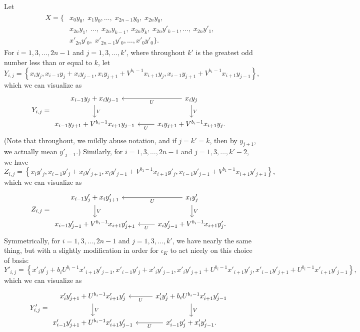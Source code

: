 \documentclass[11pt, reqno]{amsart}
\theoremstyle{definition}
\theoremstyle{remark}
\numberwithin{equation}{section}
\begin{document}
Let
\begin{gather}
\begin{aligned}\label{eqn:X}
	X = \{&x_0y_0, \; x_1y_0, \dots, \; x_{2n-1}y_0, \; x_{2n}y_0, \\
		& x_{2n}y_1, \; \dots, \; x_{2n}y_{k-1}, \; x_{2n}y_k, \; x_{2n}y'_{k-1}, \dots, \; x_{2n}y'_1, \\
		& x'_{2n}y'_0, \; x'_{2n-1}y'_0,  \dots, x'_0y'_0\}.
\end{aligned}
\end{gather}
For $i=1, 3, \dots, 2n-1$ and $j=1, 3, \dots, k'$, where throughout $k'$ is the greatest odd number less than or equal to $k$, let
\[ Y_{i, j} = \left\{ x_i y_j, x_{i-1}y_{j}+x_i y_{j-1}, x_{i} y_{j+1} + V^{b_1-1}x_{i+1}y_{j}, x_{i-1}y_{j+1}+V^{b_1-1}x_{i+1} y_{j-1}  \right\}, \]
which we can visualize as
\[
Y_{i,j} = \begin{tikzcd}
	 x_{i-1}y_{j}+x_i y_{j-1} \ar[d, "V"] & x_i y_j \ar[l, "U"] \ar[d, "V"]  \\
	 x_{i-1}y_{j+1}+V^{b_i-1}x_{i+1} y_{j-1} & x_i y_{j+1} + V^{b_i-1}x_{i+1}y_{j}. \ar[l, "U"] 
\end{tikzcd}
\]
(Note that throughout, we mildly abuse notation, and if $j=k'=k$, then by $y_{j+1}$, we actually mean $y'_{j-1}$.)
Similarly, for $i=1, 3, \dots, 2n-1$ and $j=1, 3, \dots, k'-2$, we have
\[ Z_{i, j} = \left\{ x_i y'_j, x_{i-1}y'_{j}+x_i y'_{j+1}, x_{i} y'_{j-1} + V^{b_1-1}x_{i+1}y'_{j}, x_{i-1}y'_{j-1}+V^{b_1-1}x_{i+1} y'_{j+1}  \right\}, \]
which we can visualize as
\[
Z_{i,j} = \begin{tikzcd}
	 x_{i-1}y'_{j}+x_i y'_{j+1} \ar[d, "V"] & x_i y'_j \ar[l, "U"] \ar[d, "V"]  \\
	 x_{i-1}y'_{j-1}+V^{b_i-1}x_{i+1} y'_{j+1} & x_i y'_{j-1} + V^{b_i-1}x_{i+1}y'_{j}. \ar[l, "U"] 
\end{tikzcd}
\]
Symmetrically, for $i=1, 3, \dots, 2n-1$ and $j=1, 3, \dots, k'$, we have nearly the same thing, but with a slightly modification in order for $\iota_K$ to act nicely on this choice of basis:
\[ Y'_{i,j} =  \left\{ x'_i y'_j+ b_i U^{b_i-1}x'_{i+1} y'_{j-1}, x'_{i-1}y'_{j}+x'_i y'_{j-1}, x'_{i} y'_{j+1} + U^{b_i-1}x'_{i+1}y'_{j}, x'_{i-1}y'_{j+1}+U^{b_i-1}x'_{i+1} y'_{j-1} \right\}, \]
which we can visualize as
\[
Y'_{i,j} = \begin{tikzcd}
	 x'_i y'_{j+1} + U^{b_i-1}x'_{i+1}y'_{j} \ar[d, "V"] & x'_i y'_j + b_i U^{b_i-1}x'_{i+1} y'_{j-1}\ar[l, "U"] \ar[d, "V"]  \\
	 x'_{i-1}y'_{j+1}+U^{b_i-1}x'_{i+1} y'_{j-1} & x'_{i-1}y'_{j}+x'_i y'_{j-1} .\ar[l, "U"] 
\end{tikzcd}
\]
\end{document}
